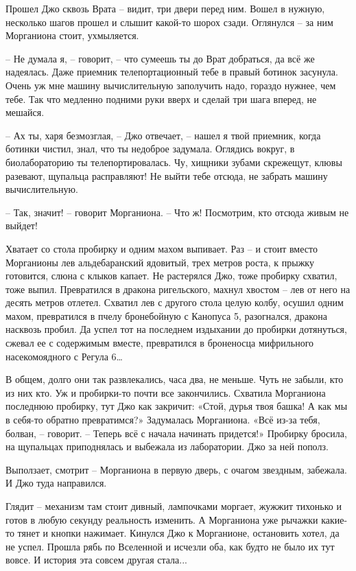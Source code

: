 \documentclass[ebook,oneside,final,openright]{memoir}
\begin{document}
\par
Прошел Джо сквозь Врата – видит, три двери перед ним. Вошел в нужную, несколько шагов прошел и слышит какой-то шорох сзади. Оглянулся – за ним Морганиона стоит, ухмыляется. \par
\par
– Не думала я, – говорит, – что сумеешь ты до Врат добраться, да всё же надеялась. Даже приемник телепортационный тебе в правый ботинок засунула. Очень уж мне машину вычислительную заполучить надо, гораздо нужнее, чем тебе. Так что медленно подними руки вверх и сделай три шага вперед, не мешайся.\par
– Ах ты, харя безмозглая, – Джо отвечает, – нашел я твой приемник, когда ботинки чистил, знал, что ты недоброе задумала. Оглядись вокруг, в биолабораторию ты телепортировалась. Чу, хищники зубами скрежещут, клювы разевают, щупальца расправляют! Не выйти тебе отсюда, не забрать машину вычислительную.\par
– Так, значит! – говорит Морганиона. – Что ж! Посмотрим, кто отсюда живым не выйдет!\par
\par
Хватает со стола пробирку и одним махом выпивает. Раз – и стоит вместо Морганионы лев альдебаранский ядовитый, трех метров роста, к прыжку готовится, слюна с клыков капает. Не растерялся Джо, тоже пробирку схватил, тоже выпил. Превратился в дракона ригельского, махнул хвостом – лев от него на десять метров отлетел. Схватил лев с другого стола целую колбу, осушил одним махом, превратился в пчелу бронебойную с Канопуса 5, разогнался, дракона насквозь пробил. Да успел тот на последнем издыхании до пробирки дотянуться, сжевал ее с содержимым вместе, превратился в броненосца мифрильного насекомоядного с Регула 6…\par
\par
В общем, долго они так развлекались, часа два, не меньше. Чуть не забыли, кто из них кто. Уж и пробирки-то почти все закончились. Схватила Морганиона последнюю пробирку, тут Джо как закричит: «Стой, дурья твоя башка! А как мы в себя-то обратно превратимся?» Задумалась Морганиона. «Всё из-за тебя, болван, – говорит. – Теперь всё с начала начинать придется!» Пробирку бросила, на щупальцах приподнялась и выбежала из лаборатории. Джо за ней пополз.\par
\par
Выползает, смотрит – Морганиона в первую дверь, с очагом звездным, забежала. И Джо туда направился.\par
\par
Глядит – механизм там стоит дивный, лампочками моргает, жужжит тихонько и готов в любую секунду реальность изменить. А Морганиона уже рычажки какие-то тянет и кнопки нажимает. Кинулся Джо к Морганионе, остановить хотел, да не успел. Прошла рябь по Вселенной и исчезли оба, как будто не было их тут вовсе. И история эта совсем другая стала...\par
\end{document}
